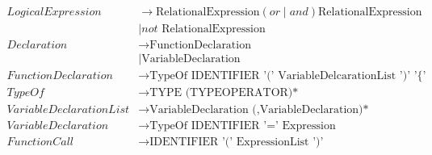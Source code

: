 \begin{align*}
    LogicalExpression           & \to \text{RelationalExpression} (or \mid and) \text{RelationalExpression}                     \\
                                & \mid not \text{ RelationalExpression}                                                         \\
    Declaration                 & \to \text{FunctionDeclaration}                                                                \\
                                & \mid \text{VariableDeclaration}                                                               \\
    FunctionDeclaration         & \to \text{TypeOf IDENTIFIER '(' VariableDelcarationList ')' '\{' Statements '\}'}               \\
    TypeOf                      & \to \text{TYPE (TYPEOPERATOR)*}                                                               \\
    VariableDeclarationList     & \to \text{VariableDeclaration (,VariableDeclaration)*}                                        \\
    VariableDeclaration         & \to \text{TypeOf IDENTIFIER '=' Expression}                                                   \\
    FunctionCall                & \to \text{IDENTIFIER '(' ExpressionList ')'}                                                    \\
\end{align*}

\cleardoublepage

